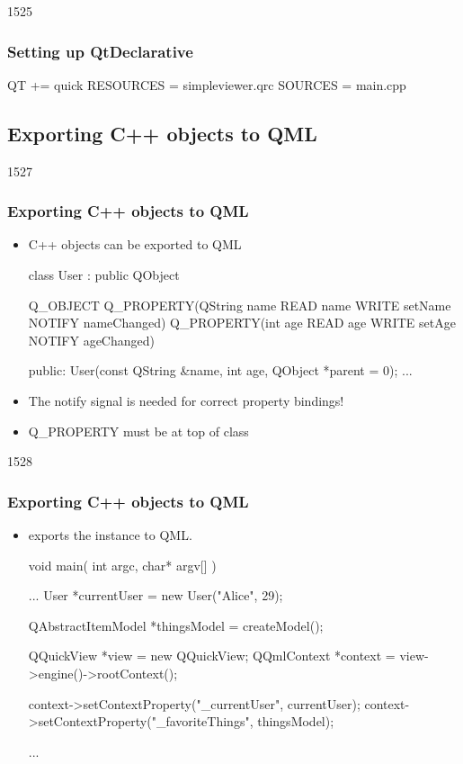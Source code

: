 \begin{slide}[fragile]{1525}\frametitle{Setting up QtDeclarative}

\begin{qmake}
QT       += quick
RESOURCES = simpleviewer.qrc
SOURCES   = main.cpp
\end{qmake}

\end{slide}

\subsection{Exporting C++ objects to QML}
\begin{slide}[fragile]{1527}\frametitle{Exporting C++ objects to QML}
\begin{itemize}
\item C++ objects can be exported to QML
\begin{cpp}
class User : public QObject
{
    Q_OBJECT
    Q_PROPERTY(QString name READ name WRITE setName
               NOTIFY nameChanged)
    Q_PROPERTY(int age READ age WRITE setAge NOTIFY ageChanged)

public:
    User(const QString &name, int age, QObject *parent = 0);
    ...
}
\end{cpp}
\item The notify signal is needed for correct property bindings!
\item Q\_PROPERTY must be at top of class
\end{itemize}

\end{slide}


\begin{slide}[fragile]{1528}\frametitle{Exporting C++ objects to QML}
\begin{itemize}
\item {} exports the instance to QML.\\[4mm]

\begin{cpp}
void main( int argc, char* argv[] ) {
    ...
    User *currentUser = new User("Alice", 29);

    QAbstractItemModel *thingsModel = createModel();

    QQuickView *view = new QQuickView;
    QQmlContext *context = view->engine()->rootContext();

    context->setContextProperty("_currentUser", currentUser);
    context->setContextProperty("_favoriteThings", thingsModel);

    ...
}
\end{cpp}
\end{itemize}
\end{slide}

